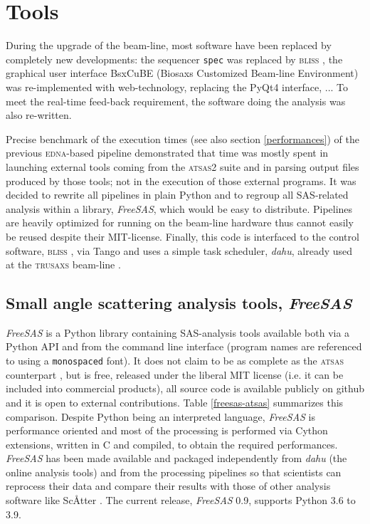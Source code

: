 \documentclass[preprint]{iucr}              %
\begin{document}
\section{Tools}
During the upgrade of the beam-line, most software have been replaced by completely new developments: the sequencer \texttt{spec} \cite{spec} was replaced by \textsc{bliss} \cite{bliss}, the graphical user interface BsxCuBE (Biosaxs Customized Beam-line Environment) was re-implemented with web-technology, replacing the PyQt4 interface, ...
To meet the real-time feed-back requirement, the software doing the analysis was also re-written.

Precise benchmark of the execution times (see also section \ref{performances}) of the previous \textsc{edna}-based pipeline \cite{BM29ODA} demonstrated that time was mostly spent in launching external tools coming from the \textsc{atsas2} suite and in parsing output files produced by those tools; not in the execution of those external programs.
It was decided to rewrite all pipelines in plain Python \cite{python} and to regroup all SAS-related analysis within a library, \textit{FreeSAS}, which would be easy to distribute. 
Pipelines \cite{dahu-bm29} are heavily optimized for running on the beam-line hardware thus cannot easily be reused despite their MIT-license.
Finally, this code is interfaced to the control software, \textsc{bliss} \cite{bliss}, via Tango \cite{tango} and uses a simple task scheduler, \textit{dahu}, already used at the \textsc{trusaxs} beam-line \cite{id02_2022}.

\subsection{Small angle scattering analysis tools, \textit{FreeSAS}}

\textit{FreeSAS} is a Python library \cite{python} containing SAS-analysis tools available both via a Python API and from the command line interface (program names are referenced to using a \texttt{monospaced} font). 
It does not claim to be as complete as the \textsc{atsas} counterpart \cite{ATSAS3},
but is free, released under the liberal MIT license (i.e. it can be included into commercial products), all source code is available publicly on github \cite{freesas} and it is open to external contributions.
Table \ref{freesas-atsas} summarizes this comparison.
Despite Python being an interpreted language, \textit{FreeSAS} is performance oriented and most of the processing is performed via Cython \cite{cython} extensions, written in C and compiled, to obtain the required performances. 
\textit{FreeSAS} has been made available and packaged independently from \textit{dahu} (the online analysis tools) and from the processing pipelines so that scientists can reprocess their data and compare their results with those of other analysis software like Sc\AA tter \cite{scatter}. 
The current release, \textit{FreeSAS} 0.9, supports Python 3.6 to 3.9.
\end{document}
